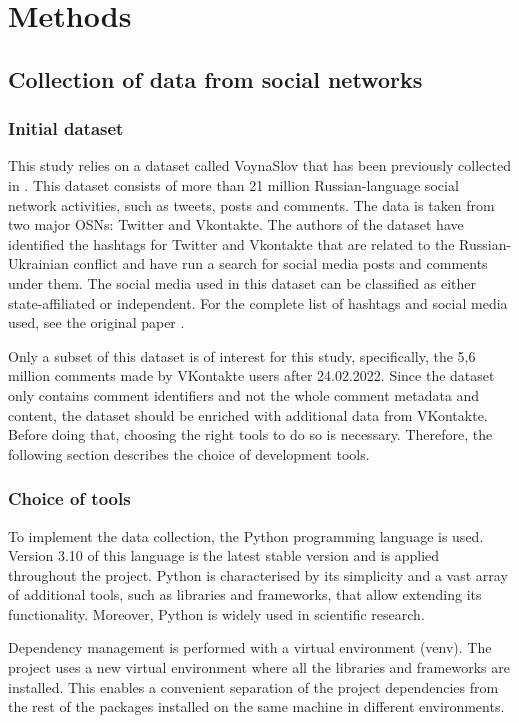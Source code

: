 \chapter{Methods}
\label{ch:methods}

\section{Collection of data from social networks}
\subsection{Initial dataset}
This study relies on a dataset called VoynaSlov that has been previously collected in \cite{Park2022}. This dataset consists of more than 21 million Russian-language social network activities, such as tweets, posts and comments. The data is taken from two major OSNs: Twitter and Vkontakte. The authors of the dataset have identified the hashtags for Twitter and Vkontakte that are related to the Russian-Ukrainian conflict and have run a search for social media posts and comments under them. The social media used in this dataset can be classified as either state-affiliated or independent. For the complete list of hashtags and social media used, see the original paper \cite{Park2022}.

Only a subset of this dataset is of interest for this study, specifically, the 5,6 million comments made by VKontakte users after 24.02.2022. Since the dataset only contains comment identifiers and not the whole comment metadata and content, the dataset should be enriched with additional data from VKontakte. Before doing that, choosing the right tools to do so is necessary. Therefore, the following section describes the choice of development tools.

\subsection{Choice of tools}
To implement the data collection, the Python programming language is used. Version 3.10 of this language is the latest stable version and is applied throughout the project. Python is characterised by its simplicity and a vast array of additional tools, such as libraries and frameworks, that allow extending its functionality. Moreover, Python is widely used in scientific research.

Dependency management is performed with a virtual environment (venv). The project uses a new virtual environment where all the libraries and frameworks are installed. This enables a convenient separation of the project dependencies from the rest of the packages installed on the same machine in different environments.

